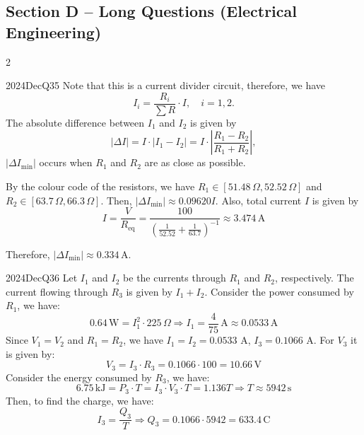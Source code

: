 \subsection*{Section D -- Long Questions (Electrical Engineering)}
\begin{multicols}{2}

\begin{qsolution}{2024}{Dec}{Q35}{\tgEE \tgEEResistors \tgEECircuitAnalysis}
    Note that this is a current divider circuit, therefore, we have
    \[I_i=\frac{R_i}{\sum R}\cdot I,\quad i=1,2.\]
    The absolute difference between $I_1$ and $I_2$ is given by
    \[\left|\Delta I\right|=I\cdot\left|I_1-I_2\right|=I\cdot\left|\frac{R_1-R_2}{R_1+R_2}\right|,\]
    $\left|\Delta I_{\mathrm{min}}\right|$ occurs when $R_1$ and $R_2$ are as close as possible.

    By the colour code of the resistors, we have $R_1\in[51.48\,\Omega,52.52\,\Omega]$ and $R_2\in[63.7\,\Omega,66.3\,\Omega]$.
    Then, $\left|\Delta I_{\mathrm{min}}\right|\approx 0.09620I$.
    Also, total current $I$ is given by
    \[I=\frac{V}{R_{\mathrm{eq}}}=\frac{100}{\left(\frac{1}{52.52}+\frac{1}{63.7}\right)^{-1}}\approx 3.474\,\mathrm{A}\]

    Therefore, $\left|\Delta I_{\mathrm{min}}\right|\approx \boxed{0.334\,\mathrm{A}}$.
\end{qsolution}

\columnbreak

\begin{qsolution}{2024}{Dec}{Q36}{\tgEE \tgEEResistors \tgEECircuitAnalysis}
    Let $I_1$ and $I_2$ be the currents through $R_1$ and $R_2$, respectively.
    The current flowing through $R_3$ is given by $I_1+I_2$.
    Consider the power consumed by $R_1$, we have:
    \[0.64\,\mathrm{W}=I_1^2\cdot 225\,\Omega \Rightarrow I_1=\frac{4}{75}\,\mathrm{A}\approx 0.0533\,\mathrm{A}\]
    Since $V_1=V_2$ and $R_1=R_2$, we have $I_1=I_2=0.0533$ A, $I_3=0.1066$ A.
    For $V_3$ it is given by:
    \[V_3=I_3\cdot R_3=0.1066\cdot 100=10.66\,\mathrm{V}\]
    Consider the energy consumed by $R_3$, we have:
    \[6.75\,\mathrm{kJ}=P_3\cdot T=I_3\cdot V_3\cdot T=1.136T \Rightarrow T\approx 5942\,\mathrm{s}\]
    Then, to find the charge, we have:
    \[I_3=\frac{Q_3}{T} \Rightarrow Q_3=0.1066\cdot 5942=\boxed{633.4\,\mathrm{C}}\]
\end{qsolution}

\end{multicols}
